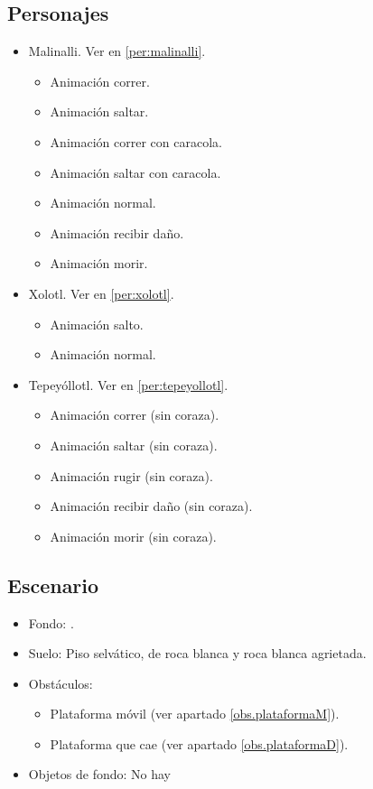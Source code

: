 	\subsection{Personajes}
	\begin{itemize}
		\item Malinalli. Ver en \ref{per:malinalli}.
		\begin{itemize}
			\item Animación correr.
			\item Animación saltar.
			\item Animación correr con caracola.
			\item Animación saltar con caracola.
			\item Animación normal.
			\item Animación recibir daño.
			\item Animación morir.
		\end{itemize} 
		\item Xolotl. Ver en \ref{per:xolotl}.
		\begin{itemize}
				\item Animación salto.
				\item Animación normal.
		\end{itemize}
		\item Tepeyóllotl. Ver en \ref{per:tepeyollotl}.
		\begin{itemize}
			\item Animación correr (sin coraza).
			\item Animación saltar (sin coraza).
			\item Animación rugir (sin coraza).
			\item Animación recibir daño (sin coraza).
			\item Animación morir (sin coraza).
		\end{itemize}
	\end{itemize}
	\subsection{Escenario}
\begin{itemize} 
	\item Fondo: .
	\item Suelo: Piso selvático, de roca blanca y roca blanca agrietada.
	\item Obstáculos:
	\begin{itemize}
		\item Plataforma móvil (ver apartado \ref{obs.plataformaM}).
			\item Plataforma que cae (ver apartado \ref{obs.plataformaD}).
	\end{itemize}
	\item Objetos de fondo: No hay
\end{itemize}		
